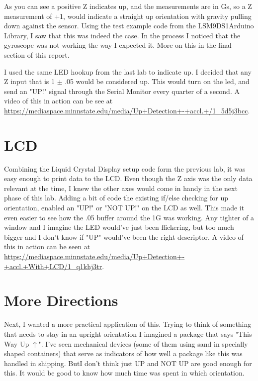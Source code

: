 \documentclass[prb,preprint]{revtex4-1}
\newcommand{\dev}{LSM9DS1} %
\begin{document}
As you can see a positive Z indicates up, and the measurements are in Gs, so a Z measurement of +1, would indicate a straight up orientation with gravity pulling down against the sensor. Using the test example code from the \dev Arduino Library, I saw that this was indeed the case. In the process I noticed that the gyroscope was not working the way I expected it. More on this in the final section of this report.

I used the same LED hookup from the last lab to indicate up. I decided that any Z input that is 1 $\pm$ .05 would be considered up. This would turn on the led, and send an "UP!" signal through the Serial Monitor every quarter of a second. A video of this in action can be see at \url{https://mediaspace.minnstate.edu/media/Up+Detection+-+accl.+/1_5d5j3bcc}.

\section{LCD}
Combining the Liquid Crystal Display setup code form the previous lab, it was easy enough to print data to the LCD. Even though the Z axis was the only data relevant at the time, I knew the other axes would come in handy in the next phase of this lab. Adding a bit of code the existing if/else checking for up orientation, enabled an "UP!" or "NOT UP!" on the LCD as well. This made it even easier to see how the .05 buffer around the 1G was working. Any tighter of a window and I imagine the LED would've just been flickering, but too much bigger and I don't know if "UP" would've been the right descriptor. A video of this in action can be seen at \url{https://mediaspace.minnstate.edu/media/Up+Detection+-+accl.+With+LCD/1_q1khj3tr}.



\section{More Directions}
Next, I wanted a more practical application of this. Trying to think of something that needs to stay in an upright orientation I imagined a package that says "This Way Up $\uparrow$". I've seen mechanical devices (some of them using sand in specially shaped containers) that serve as indicators of how well a package like this was handled in shipping. ButI don't think just UP and NOT UP are good enough for this. It would be good to know how much time was spent in which orientation.
\end{document}
